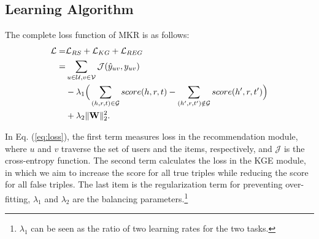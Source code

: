 \documentclass[sigconf]{acmart}
\begin{document}
	\subsection{Learning Algorithm}
		The complete loss function of MKR is as follows:
		\begin{equation}
		\label{eq:loss}
		\begin{split}
			\mathcal L =& \mathcal L_{RS} + \mathcal L_{KG} + \mathcal L_{REG}\\
			=& \sum_{u \in \mathcal U, v \in \mathcal V} \mathcal J(\hat y_{uv}, y_{uv})\\
			&- \lambda_1 \Big( \sum_{(h, r, t) \in \mathcal G} score(h, r, t) - \sum_{(h', r, t') \notin \mathcal G} score(h', r, t') \Big)\\
			&+ \lambda_2 \| {\bf W} \|_2^2.
		\end{split}
		\end{equation}
			
		In Eq. (\ref{eq:loss}), the first term measures loss in the recommendation module, where $u$ and $v$ traverse the set of users and the items, respectively, and $\mathcal J$ is the cross-entropy function.
		The second term calculates the loss in the KGE module, in which we aim to increase the score for all true triples while reducing the score for all false triples.
		The last item is the regularization term for preventing over-fitting, $\lambda_1$ and $\lambda_2$ are the balancing parameters.\footnote{$\lambda_1$ can be seen as the ratio of two learning rates for the two tasks.}
			
\end{document}
